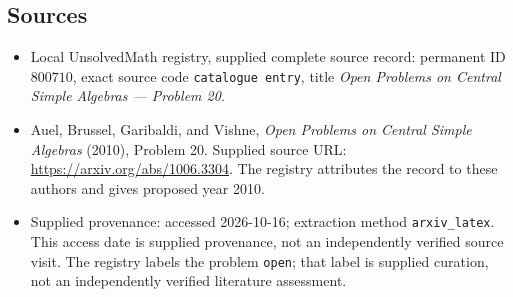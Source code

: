 \documentclass[11pt]{article}
\begin{document}
\subsection{Sources}
\begin{itemize}
\item Local UnsolvedMath registry, supplied complete source record: permanent ID \(800710\), exact source code \texttt{catalogue entry}, title \emph{Open Problems on Central Simple Algebras --- Problem 20}.
\item Auel, Brussel, Garibaldi, and Vishne, \emph{Open Problems on Central Simple Algebras} (2010), Problem 20. Supplied source URL: \url{https://arxiv.org/abs/1006.3304}. The registry attributes the record to these authors and gives proposed year 2010.
\item Supplied provenance: accessed 2026-10-16; extraction method \texttt{arxiv\_latex}. This access date is supplied provenance, not an independently verified source visit. The registry labels the problem \texttt{open}; that label is supplied curation, not an independently verified literature assessment.
\end{itemize}
\end{document}
